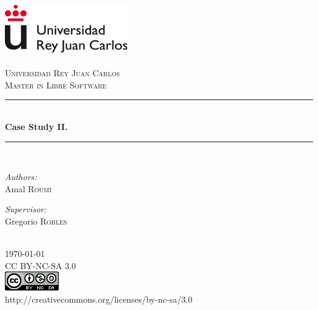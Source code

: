 \documentclass[11pt]{article} %
\begin{document}
\begin{titlepage}
\newcommand{\HRule}{\rule{\linewidth}{0.5mm}} %
\center %
\includegraphics{urjc} \\[0.5cm] %
\textsc{\LARGE \\Universidad Rey Juan Carlos}\\[1cm] %
\textsc{\Large Master in Libre Software}\\[0.5cm] %
\HRule \\[1.5cm]
{ \huge \bfseries Case Study II.}\\[0.4cm] %
\HRule \\[1.5cm]
\begin{minipage}{0.4\textwidth}
\begin{flushleft} \large
\emph{Authors:}\\
Amal \textsc{Roumi}\\ %
\end{flushleft}
\end{minipage}
\begin{minipage}{0.4\textwidth}
\begin{flushright} \large
\emph{Supervisor:} \\
Gregorio  \textsc{Robles} %
\end{flushright}
\end{minipage}\\[1.5cm]
{\large \today}\\[1.8cm] %
\textsc CC BY-NC-SA 3.0\\[0.2cm]
\includegraphics[scale=0.5]{license} \\ %
{\small http://creativecommons.org/licenses/by-nc-sa/3.0}\\
\mbox{}

\end{titlepage}
\tableofcontents
\end{document}
